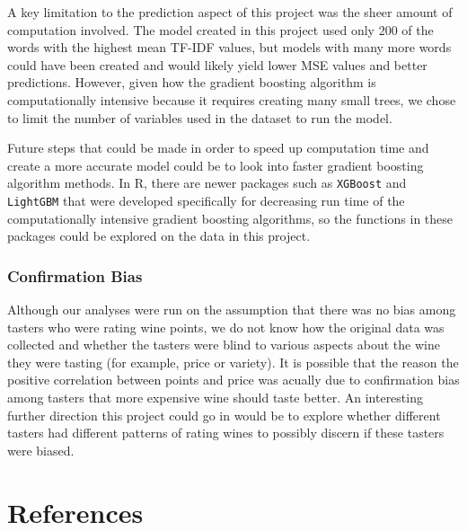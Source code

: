 \documentclass[12pt,twoside]{amherstthesis}
\begin{document}
A key limitation to the prediction aspect of this project was the sheer
amount of computation involved. The model created in this project used
only 200 of the words with the highest mean TF-IDF values, but models
with many more words could have been created and would likely yield
lower MSE values and better predictions. However, given how the gradient
boosting algorithm is computationally intensive because it requires
creating many small trees, we chose to limit the number of variables
used in the dataset to run the model.

Future steps that could be made in order to speed up computation time
and create a more accurate model could be to look into faster gradient
boosting algorithm methods. In R, there are newer packages such as
\texttt{XGBoost} and \texttt{LightGBM} that were developed specifically
for decreasing run time of the computationally intensive gradient
boosting algorithms, so the functions in these packages could be
explored on the data in this project.

\subsection{Confirmation Bias}\label{confirmation-bias}

Although our analyses were run on the assumption that there was no bias
among tasters who were rating wine points, we do not know how the
original data was collected and whether the tasters were blind to
various aspects about the wine they were tasting (for example, price or
variety). It is possible that the reason the positive correlation
between points and price was acually due to confirmation bias among
tasters that more expensive wine should taste better. An interesting
further direction this project could go in would be to explore whether
different tasters had different patterns of rating wines to possibly
discern if these tasters were biased.

\backmatter

\chapter*{References}\label{references}


\noindent

\setlength{\parindent}{-0.20in} \setlength{\leftskip}{0.20in}
\setlength{\parskip}{8pt}
\end{document}
